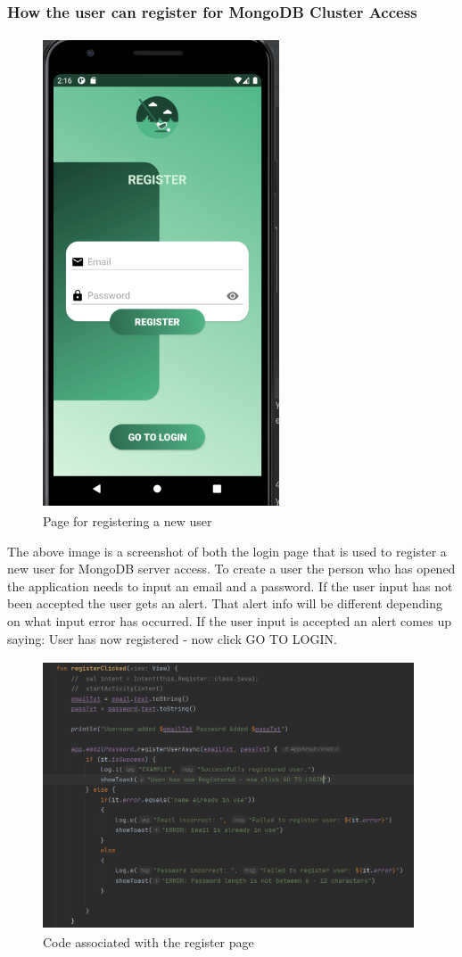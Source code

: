 \subsubsection{How the user can register for MongoDB Cluster Access}
\begin{figure}[H]
    \centering
    \includegraphics[width=7cm, height = 14cm]{img/registerPage.PNG}
    \caption{Page for registering a new user}
    \label{fig:altas config}
\end{figure}
The above image is a screenshot of both the login page that is used to register a new user for MongoDB server access. To create a user the person who has opened the application needs to input an email and a password. If the user input has not been accepted the user gets an alert. That alert info will be different depending on what input error has occurred. If the user input is accepted an alert comes up saying: User has now registered - now click GO TO LOGIN.
\begin{figure}[H]
    \centering
    \includegraphics[width=11cm, height= 8cm]{img/registerCode.PNG}
    \caption{Code associated with the register page}
    \label{fig:altas config}
\end{figure}
